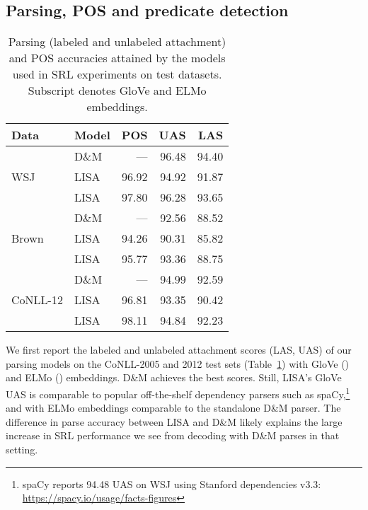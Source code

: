 \documentclass[11pt,a4paper]{article}
\begin{document}
\subsection{Parsing, POS and predicate detection \label{sec:parse-pos-results}}

\begin{table}
\begin{tabular}{llrrr} 		
Data & Model & POS & UAS & LAS \\ \hline \hline
\multirow{3}{*}{WSJ} & D\&M & --- & 96.48 & 94.40 \\
& LISA & 96.92 & 94.92 & 91.87 \\ 
& LISA & 97.80 & 96.28 & 93.65 \\ \hline
\multirow{3}{*}{Brown} & D\&M & --- & 92.56 & 88.52 \\
& LISA & 94.26 & 90.31 & 85.82 \\ 
& LISA & 95.77 & 93.36 & 88.75 \\ \hline
\multirow{3}{*}{CoNLL-12} & D\&M & --- & 94.99 & 92.59 \\
& LISA & 96.81 & 93.35 & 90.42 \\
& LISA & 98.11 & 94.84 & 92.23 \\
\end{tabular}
\caption{\label{parsing-numbers} Parsing (labeled and unlabeled attachment) and POS accuracies attained by the models used in SRL experiments on test datasets. Subscript  denotes GloVe and  ELMo embeddings.}
\end{table}

We first report the labeled and unlabeled attachment scores (LAS, UAS) of our parsing models on the CoNLL-2005 and 2012 test sets (Table~\ref{parsing-numbers}) with GloVe () and ELMo () embeddings. D\&M achieves the best scores. Still, LISA's GloVe UAS is comparable to popular off-the-shelf dependency parsers such as spaCy,\footnote{spaCy reports 94.48 UAS on WSJ using Stanford dependencies v3.3: \protect\url{https://spacy.io/usage/facts-figures}} and with ELMo embeddings comparable to the standalone D\&M parser. The difference in parse accuracy between LISA and D\&M likely explains the large increase in SRL performance we see from decoding with D\&M parses in that setting.
\end{document}
